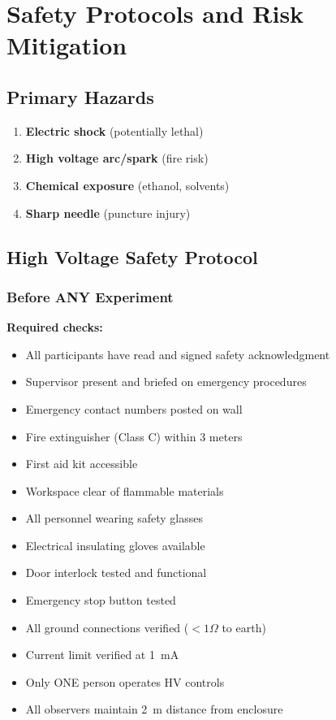 \documentclass[11pt]{article}
\begin{document}
\section{Safety Protocols and Risk Mitigation}

\subsection{Primary Hazards}

\begin{enumerate}
\item \textbf{Electric shock} (potentially lethal)
\item \textbf{High voltage arc/spark} (fire risk)
\item \textbf{Chemical exposure} (ethanol, solvents)
\item \textbf{Sharp needle} (puncture injury)
\end{enumerate}

\subsection{High Voltage Safety Protocol}

\subsubsection{Before ANY Experiment}

\textbf{Required checks:}

\begin{itemize}
\item[$\square$] All participants have read and signed safety acknowledgment
\item[$\square$] Supervisor present and briefed on emergency procedures
\item[$\square$] Emergency contact numbers posted on wall
\item[$\square$] Fire extinguisher (Class C) within 3 meters
\item[$\square$] First aid kit accessible
\item[$\square$] Workspace clear of flammable materials
\item[$\square$] All personnel wearing safety glasses
\item[$\square$] Electrical insulating gloves available
\item[$\square$] Door interlock tested and functional
\item[$\square$] Emergency stop button tested
\item[$\square$] All ground connections verified ($<1\Omega$ to earth)
\item[$\square$] Current limit verified at 1~mA
\item[$\square$] Only ONE person operates HV controls
\item[$\square$] All observers maintain 2~m distance from enclosure
\end{itemize}
\end{document}
